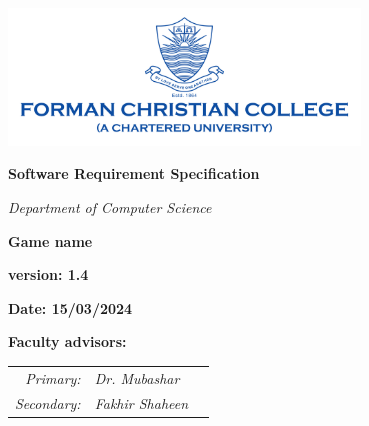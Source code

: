 
\begin{titlepage}
    \centering
    \vspace*{0.5cm}
    \includegraphics[width=0.7\textwidth]{./images/fcc_logo} %
    \vspace{2.5cm}

    {\LARGE\bfseries Software Requirement Specification\par}
    \vspace{0.5cm}
    {\Large\itshape Department of Computer Science\par}
    \vspace{2.5cm}
    {\ProjectTitle\bfseries Game name\par}
    \vspace{3.5cm}
    {\large\bfseries version: 1.4\par}
    \vspace{0.5cm}
    {\large\bfseries Date: 15/03/2024\par}
    
    \newpage
    
    \vspace*{\fill}

    \begin{center}
        {\Large\bfseries Faculty advisors:\par}

        \vspace{3em} %
        
        \begin{center}
        \begin{tabular}{r l c}
            \textit{Primary:} & \textit{Dr. Mubashar} & \raisebox{-1.0ex}{\rule{5cm}{.4pt}} \\[1cm]
            \textit{Secondary:} & \textit{Fakhir Shaheen} & \raisebox{-1.0ex}{\rule{5cm}{.4pt}} \\
        \end{tabular}
        \end{center}
    
        \vspace{3cm}
    

\end{center}
\end{titlepage}
